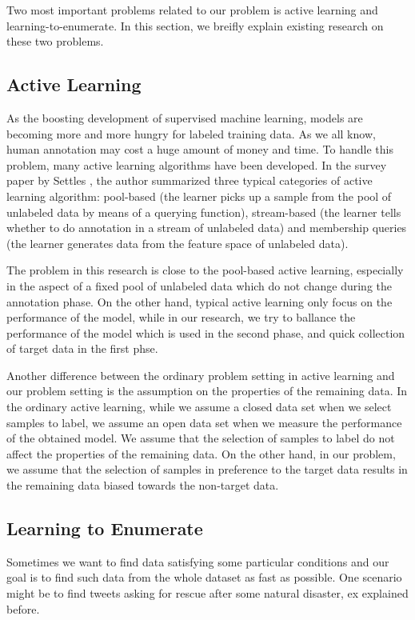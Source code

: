 \documentclass{deime}
\begin{document}
Two most important problems related to our problem is active learning
and learning-to-enumerate.  In this section, we breifly explain
existing research on these two problems.

\subsection{Active Learning \cite{survey2}}

As the boosting development of supervised machine learning, models are
becoming more and more hungry for labeled training data. As we all
know, human annotation may cost a huge amount of money and time. To
handle this problem, many active learning algorithms have been
developed. In the survey paper by Settles \cite{survey2}, the author
summarized three typical categories of active learning algorithm:
pool-based (the learner picks up a sample from the pool of unlabeled
data by means of a querying function), stream-based (the learner tells
whether to do annotation in a stream of unlabeled data) and membership
queries (the learner generates data from the feature space of
unlabeled data).

The problem in this research is close to the pool-based active
learning, especially in the aspect of a fixed pool of unlabeled data
which do not change during the annotation phase. On the other hand,
typical active learning only focus on the performance of the model,
while in our research, we try to ballance the performance of the model
which is used in the second phase, and quick collection of target data
in the first phse.

Another difference between the ordinary problem setting in active
learning and our problem setting is the assumption on the properties
of the remaining data.  In the ordinary active learning, while we
assume a closed data set when we select samples to label, we assume an
open data set when we measure the performance of the obtained model.
We assume that the selection of samples to label do not affect the
properties of the remaining data.  On the other hand, in our problem,
we assume that the selection of samples in preference to the target
data results in the remaining data biased towards the non-target data.

\subsection{Learning to Enumerate \cite{enumerate}}

Sometimes we want to find data satisfying some particular conditions
and our goal is to find such data from the whole dataset as fast as
possible.  One scenario might be to find
tweets asking for rescue after some natural disaster, ex explained
before.
\end{document}
